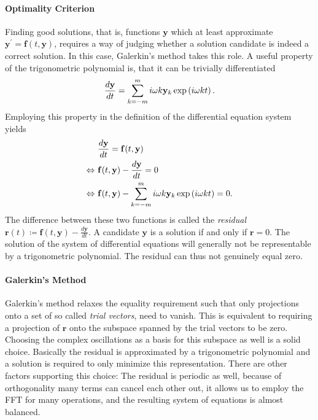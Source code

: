 \paragraph{Optimality Criterion} Finding good solutions, that is, functions $\mathbf{y}$ which at least approximate $\mathbf{y}^\prime = \mathbf{f}(t, \mathbf{y})$, requires a way of judging whether a solution candidate is indeed a correct solution.
In this case, Galerkin's method takes this role.
A useful property of the trigonometric polynomial is, that it can be trivially differentiated
	\begin{equation}
			\frac{d\mathbf{y}}{dt} = \sum_{k = -m}^m i \omega k \mathbf{y}_k \exp\left(i \omega k t\right) \text.
	\label{eq:trigondiff}
	\end{equation}
Employing this property in the definition of the differential equation system yields
	\begin{align*}
			& \frac{d\mathbf{y}}{dt} = \mathbf{f}(t,\mathbf{y})\\
		\Leftrightarrow\ & \mathbf{f}(t,\mathbf{y}) - \frac{d\mathbf{y}}{dt} = 0\\
		\Leftrightarrow\ & \mathbf{f}(t,\mathbf{y}) - \sum_{k = -m}^m i \omega k \mathbf{y}_k \exp\left(i \omega k t\right) = 0 \text.
	\end{align*}
The difference between these two functions is called the \emph{residual} $\mathbf{r}(t) \coloneqq \mathbf{f}(t,\mathbf{y}) - \frac{d\mathbf{y}}{dt}$.
A candidate $\mathbf y$ is a solution if and only if $\mathbf r = 0$.
The solution of the system of differential equations will generally not be representable by a trigonometric polynomial.
The residual can thus not genuinely equal zero.

\paragraph{Galerkin's Method} Galerkin's method relaxes the equality requirement such that only projections onto a set of so called \emph{trial vectors}, need to vanish.
This is equivalent to requiring a projection of $\mathbf{r}$ onto the subspace spanned by the trial vectors to be zero.
Choosing the complex oscillations as a basis for this subspace as well is a solid choice.
Basically the residual is approximated by a trigonometric polynomial and a solution is required to only minimize this representation.
There are other factors supporting this choice: The residual is periodic as well, because of orthogonality many terms can cancel each other out, it allows us to employ the FFT for many operations, and the resulting system of equations is almost balanced.

